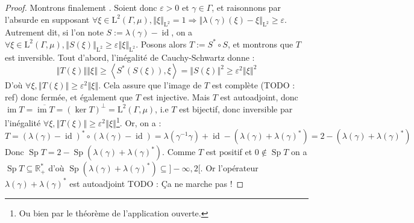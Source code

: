 \documentclass[a4paper,12pt]{article}
\newcommand{\R}{\mathbb{R}}
\newcommand{\norm}[1]{\left\Vert #1\right\Vert}
\newcommand{\ket}[1]{\left\langle #1 \right\rangle}
\newcommand{\closure}[1]{\overline{#1}}
\newcommand{\inv}{^{-1}}
\newcommand{\comp}{\circ}
\renewcommand{\implies}{\Rightarrow}
\newcommand{\TODO}[1]{{\color{red}TODO :} #1}
\DeclareMathOperator{\Id}{id}
\DeclareMathOperator{\Ima}{im}
\DeclareMathOperator{\Sp}{Sp}
\begin{document}
\begin{proof}
    Montrons finalement \framebox{$(\ref{amenable_weak_contain/weak_contain})\implies(\ref{amenable_weak_contain/weak_almost_invariant})$}. Soient donc $\varepsilon>0$ et $\gamma\in\Gamma$,
    et raisonnons par l'absurde en supposant $\forall \xi\in\mathrm{L}^2(\Gamma, \mu), \norm{\xi}_{\mathrm{L}^2} = 1\implies \norm{\lambda(\gamma)(\xi) - \xi}_{\mathrm{L}^2}\geq\varepsilon$.
    Autrement dit, si l'on note $S:=\lambda(\gamma) - \Id$, on a $\forall\xi\in\mathrm{L}^2(\Gamma, \mu), \norm{S(\xi)}_{\mathrm{L}^2}\ge\varepsilon\norm{\xi}_{\mathrm{L}^2}$.
    Posons alors $T := S^*\comp S$, et montrons que $T$ est inversible. Tout d'abord, l'inégalité de Cauchy-Schwartz donne :
    \begin{equation*}
        \norm{T(\xi)}\norm{\xi}\geq\ket{S^*(S(\xi)), \xi}=\norm{S(\xi)}^2\geq\varepsilon^2\norm{\xi}^2
    \end{equation*}
    D'où $\forall\xi, \norm{T(\xi)}\geq\varepsilon^2\norm{\xi}$. Cela assure que l'image de $T$ est complète (\TODO{ref}) donc fermée,
    et également que $T$ est injective. Mais $T$ est autoadjoint, donc $\Ima T = \closure{\Ima T} = (\ker T)^\perp = \mathrm{L}^2(\Gamma, \mu)$, i.e $T$ est bijectif,
    donc inversible par l'inégalité $\forall\xi, \norm{T(\xi)}\geq\varepsilon^2\norm{\xi}$\footnote{Ou bien par le théorème de l'application ouverte.}.
    Or, on a :
    \begin{equation*}
        T = (\lambda(\gamma)-\Id)^*\comp(\lambda(\gamma)-\Id) = \lambda(\gamma\inv\gamma)+\Id-(\lambda(\gamma) + \lambda(\gamma)^*) = 2-(\lambda(\gamma) + \lambda(\gamma)^*)
    \end{equation*}
    Donc $\Sp T = 2-\Sp(\lambda(\gamma) + \lambda(\gamma)^*)$. Comme $T$ est positif et $0\notin\Sp T$
    on a $\Sp T\subseteq\R_+^*$ d'où $\Sp(\lambda(\gamma) + \lambda(\gamma)^*)\subseteq]-\infty, 2[$. Or l'opérateur $\lambda(\gamma)+\lambda(\gamma)^*$ est autoadjoint
    \TODO{Ça ne marche pas !}
\end{proof}
\end{document}
